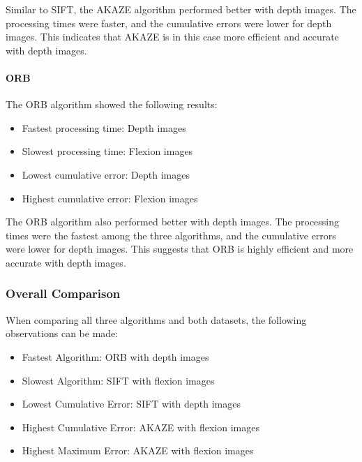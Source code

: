 \documentclass[conference, a4paper]{IEEEtran}
\begin{document}
Similar to SIFT, the AKAZE algorithm performed better with depth images. The processing times were faster, and the cumulative errors were lower for depth images. This indicates that AKAZE is in this case more efficient and accurate with depth images.

\paragraph{ORB}
The ORB algorithm showed the following results:

\begin{itemize}
	\item Fastest processing time: Depth images
	\item Slowest processing time: Flexion images
	\item Lowest cumulative error: Depth images
	\item Highest cumulative error: Flexion images
\end{itemize}

The ORB algorithm also performed better with depth images. The processing times were the fastest among the three algorithms, and the cumulative errors were lower for depth images. This suggests that ORB is highly efficient and more accurate with depth images.

\subsubsection{Overall Comparison}
When comparing all three algorithms and both datasets, the following observations can be made:

\begin{itemize}
	\item Fastest Algorithm: ORB with depth images
	\item Slowest Algorithm: SIFT with flexion images
	\item Lowest Cumulative Error: SIFT with depth images
	\item Highest Cumulative Error: AKAZE with flexion images
	\item Highest Maximum Error: AKAZE with flexion images
\end{itemize}
\end{document}
